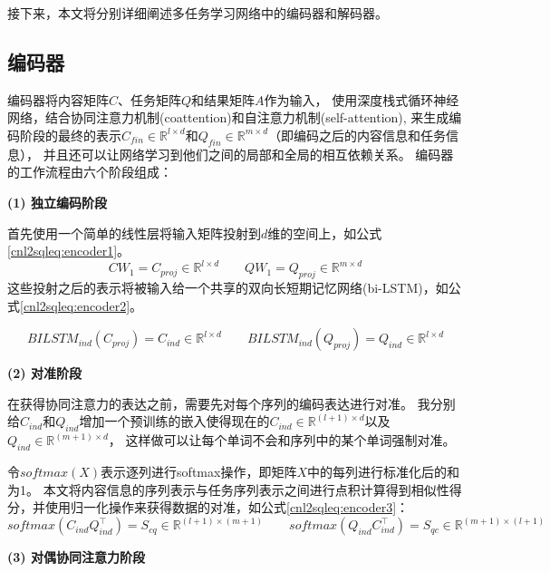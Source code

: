 接下来，本文将分别详细阐述多任务学习网络中的编码器和解码器。

\subsection{编码器}
\label{cnl2sql:encoder}

编码器将内容矩阵$C$、任务矩阵$Q$和结果矩阵$A$作为输入，
使用深度栈式循环神经网络，结合协同注意力机制(coattention)和自注意力机制(self-attention),
来生成编码阶段的最终的表示$C_{fin} \in \mathbb{R}^{l \times d}$和$Q_{fin} \in \mathbb{R}^{m \times d}$（即编码之后的内容信息和任务信息），
并且还可以让网络学习到他们之间的局部和全局的相互依赖关系。
编码器的工作流程由六个阶段组成：

\textbf{(1) 独立编码阶段}

首先使用一个简单的线性层将输入矩阵投射到$d$维的空间上，如公式\ref{cnl2sqleq:encoder1}。
\begin{equation}
    \label{cnl2sqleq:encoder1}
    CW_1 = C_{proj} \in \mathbb{R}^{l \times d} \qquad QW_1 = Q_{proj} \in \mathbb{R}^{m \times d} 
  \end{equation}
这些投射之后的表示将被输入给一个共享的双向长短期记忆网络(bi-LSTM)\cite{hochreiter1997long,graves2005framewise}，如公式\ref{cnl2sqleq:encoder2}。

\begin{equation}
    \label{cnl2sqleq:encoder2}
    BILSTM_{ind}(C_{proj}) = C_{ind} \in \mathbb{R}^{l \times d} \qquad BILSTM_{ind}(Q_{proj}) = Q_{ind} \in \mathbb{R}^{l \times d}
\end{equation}

\textbf{(2) 对准阶段}

在获得协同注意力的表达之前，需要先对每个序列的编码表达进行对准。
我分别给$C_{ind}$和$Q_{ind}$增加一个预训练的嵌入使得现在的$C_{ind} \in \mathbb{R}^{(l+1) \times d}$以及$Q_{ind} \in \mathbb{R}^{(m+1) \times d}$，
这样做可以让每个单词不会和序列中的某个单词强制对准。

令$softmax(X)$表示逐列进行softmax操作，即矩阵$X$中的每列进行标准化后的和为1。
本文将内容信息的序列表示与任务序列表示之间进行点积计算得到相似性得分，并使用归一化操作来获得数据的对准，如公式\ref{cnl2sqleq:encoder3}：
\begin{equation}
  \label{cnl2sqleq:encoder3}
  softmax(C_{ind}Q_{ind}^{\top}) = S_{cq} \in \mathbb{R}^{(l+1) \times (m+1)} \qquad softmax(Q_{ind}C_{ind}^{\top}) = S_{qc} \in \mathbb{R}^{(m+1) \times (l+1)}
\end{equation}

\textbf{(3) 对偶协同注意力阶段}

